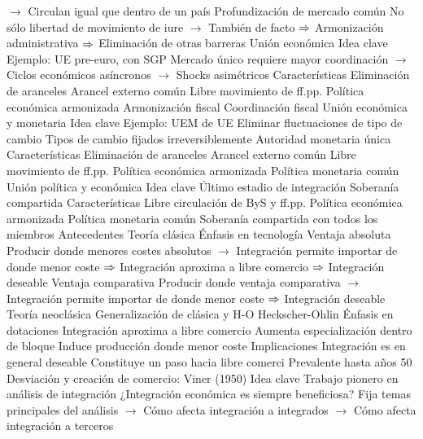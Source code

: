 \documentclass{nuevotema}
\begin{document}
\begin{esquemal}
				\4[] $\to$ Circulan igual que dentro de un país
				\4 Profundización de mercado común
				\4[] No sólo libertad de movimiento de iure
				\4[] $\to$ También de facto
				\4[] $\Rightarrow$ Armonización administrativa
				\4[] $\Rightarrow$ Eliminación de otras barreras
		\2 Unión económica
			\3 Idea clave
				\4 Ejemplo: UE pre-euro, con SGP
				\4 Mercado único requiere mayor coordinación
				\4[] $\to$ Ciclos económicos asíncronos
				\4[] $\to$ Shocks asimétricos
			\3 Características
				\4 Eliminación de aranceles
				\4 Arancel externo común
				\4 Libre movimiento de ff.pp.
				\4 Política económica armonizada
				\4[] Armonización fiscal
				\4[] Coordinación fiscal
		\2 Unión económica y monetaria
			\3 Idea clave
				\4 Ejemplo: UEM de UE
				\4 Eliminar fluctuaciones de tipo de cambio
				\4[] Tipos de cambio fijados irreversiblemente
				\4 Autoridad monetaria única
			\3 Características
				\4 Eliminación de aranceles
				\4 Arancel externo común
				\4 Libre movimiento de ff.pp.
				\4 Política económica armonizada
				\4 Política monetaria común
		\2 Unión política y económica
			\3 Idea clave
				\4 Último estadio de integración
				\4 Soberanía compartida
			\3 Características
				\4 Libre circulación de ByS y ff.pp.
				\4 Política económica armonizada
				\4 Política monetaria común
				\4 Soberanía compartida con todos los miembros
	\1 
		\2 Antecedentes
			\3 Teoría clásica
				\4 Énfasis en tecnología
				\4 Ventaja absoluta
				\4[] Producir donde menores costes absolutos
				\4[] $\to$ Integración permite importar de donde menor coste
				\4[] $\Rightarrow$ Integración aproxima a libre comercio
				\4[] $\Rightarrow$ Integración deseable
				\4 Ventaja comparativa
				\4[] Producir donde ventaja comparativa
				\4[] $\to$ Integración permite importar de donde menor coste
				\4[] $\Rightarrow$ Integración deseable
			\3 Teoría neoclásica
				\4 Generalización de clásica y H-O
				\4 Heckscher-Ohlin
				\4[] Énfasis en dotaciones
				\4 Integración aproxima a libre comercio
				\4[] Aumenta especialización dentro de bloque
				\4[] Induce producción donde menor coste
			\3 Implicaciones
				\4 Integración es en general deseable
				\4 Constituye un paso hacia libre comerci
				\4 Prevalente hasta años 50
		\2 Desviación y creación de comercio: Viner (1950)
			\3 Idea clave
				\4 Trabajo pionero en análisis de integración
				\4[] ¿Integración económica es siempre beneficiosa?
				\4 Fija temas principales del análisis
				\4[] $\to$ Cómo afecta integración a integrados
				\4[] $\to$ Cómo afecta integración a terceros

\end{esquemal}
\end{document}

